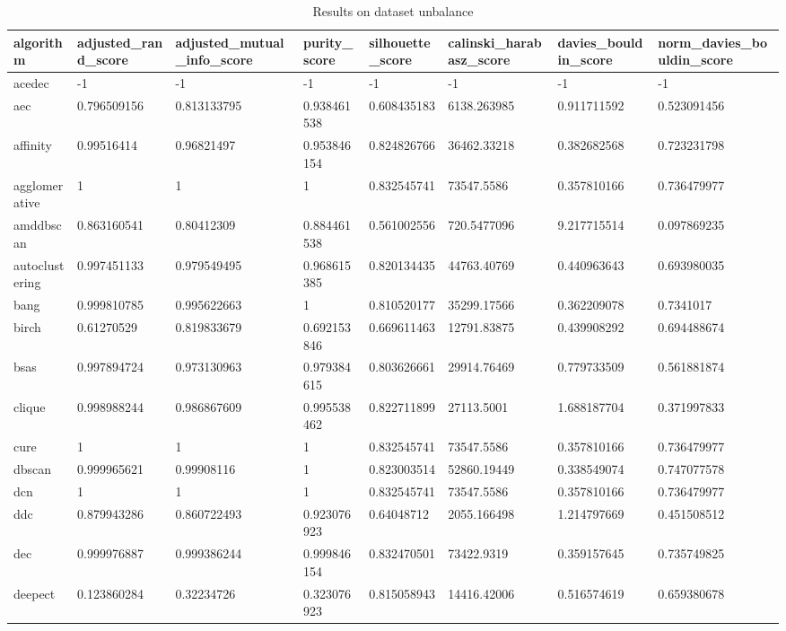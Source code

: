 \begin{table}[H]
\centering
\caption{Results on dataset unbalance}
\label{tab:params:unbalance}
\begin{tabular}{|l|l|l|l|l|l|l|l|}
\hline
algorithm & adjusted\_rand\_score & adjusted\_mutual\_info\_score & purity\_score & silhouette\_score & calinski\_harabasz\_score & davies\_bouldin\_score & norm\_davies\_bouldin\_score \\
\hline
acedec & -1 & -1 & -1 & -1 & -1 & -1 & -1 \\
\hline
aec & 0.796509156 & 0.813133795 & 0.938461538 & 0.608435183 & 6138.263985 & 0.911711592 & 0.523091456 \\
\hline
affinity & 0.99516414 & 0.96821497 & 0.953846154 & 0.824826766 & 36462.33218 & 0.382682568 & 0.723231798 \\
\hline
agglomerative & 1 & 1 & 1 & 0.832545741 & 73547.5586 & 0.357810166 & 0.736479977 \\
\hline
amddbscan & 0.863160541 & 0.80412309 & 0.884461538 & 0.561002556 & 720.5477096 & 9.217715514 & 0.097869235 \\
\hline
autoclustering & 0.997451133 & 0.979549495 & 0.968615385 & 0.820134435 & 44763.40769 & 0.440963643 & 0.693980035 \\
\hline
bang & 0.999810785 & 0.995622663 & 1 & 0.810520177 & 35299.17566 & 0.362209078 & 0.7341017 \\
\hline
birch & 0.61270529 & 0.819833679 & 0.692153846 & 0.669611463 & 12791.83875 & 0.439908292 & 0.694488674 \\
\hline
bsas & 0.997894724 & 0.973130963 & 0.979384615 & 0.803626661 & 29914.76469 & 0.779733509 & 0.561881874 \\
\hline
clique & 0.998988244 & 0.986867609 & 0.995538462 & 0.822711899 & 27113.5001 & 1.688187704 & 0.371997833 \\
\hline
cure & 1 & 1 & 1 & 0.832545741 & 73547.5586 & 0.357810166 & 0.736479977 \\
\hline
dbscan & 0.999965621 & 0.99908116 & 1 & 0.823003514 & 52860.19449 & 0.338549074 & 0.747077578 \\
\hline
dcn & 1 & 1 & 1 & 0.832545741 & 73547.5586 & 0.357810166 & 0.736479977 \\
\hline
ddc & 0.879943286 & 0.860722493 & 0.923076923 & 0.64048712 & 2055.166498 & 1.214797669 & 0.451508512 \\
\hline
dec & 0.999976887 & 0.999386244 & 0.999846154 & 0.832470501 & 73422.9319 & 0.359157645 & 0.735749825 \\
\hline
deepect & 0.123860284 & 0.32234726 & 0.323076923 & 0.815058943 & 14416.42006 & 0.516574619 & 0.659380678 \\

\end{tabular}
\end{table}
